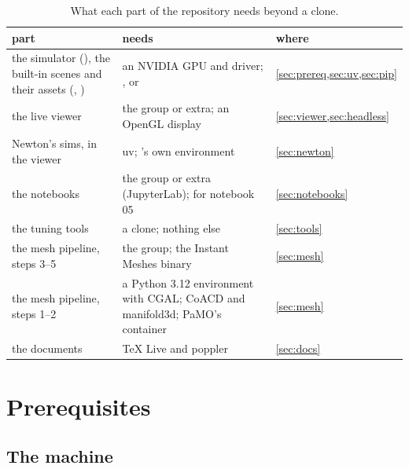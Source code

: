 \begin{table}[h]
\centering
\caption{What each part of the repository needs beyond a clone.}
\label{tab:parts}
\small
\begin{tabularx}{\linewidth}{@{}L{40mm}YL{25mm}@{}}
\toprule
part & needs & where \\
\midrule
the simulator (), the built-in scenes and their assets (, ) & an NVIDIA GPU and driver; , or  & \cref{sec:prereq,sec:uv,sec:pip} \\
the live viewer & the  group or extra; an OpenGL display & \cref{sec:viewer,sec:headless} \\
Newton's sims, in the viewer & uv; 's own environment & \cref{sec:newton} \\
the notebooks & the  group or extra (JupyterLab);  for notebook 05 & \cref{sec:notebooks} \\
the tuning tools & a clone; nothing else & \cref{sec:tools} \\
the mesh pipeline, steps 3--5 & the  group; the Instant Meshes binary & \cref{sec:mesh} \\
the mesh pipeline, steps 1--2 & a Python 3.12 environment with CGAL; CoACD and manifold3d; PaMO's container & \cref{sec:mesh} \\
the documents & TeX Live and poppler & \cref{sec:docs} \\
\bottomrule
\end{tabularx}
\end{table}

\section{Prerequisites}\label{sec:prereq}

\subsection{The machine}\label{sec:machine}

